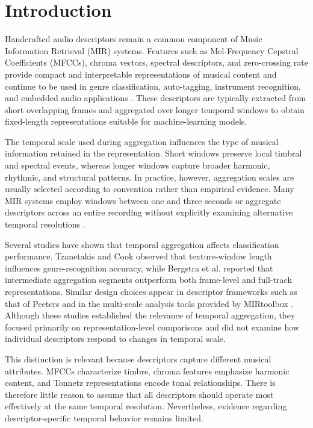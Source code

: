 \documentclass[runningheads]{llncs}
\begin{document}
\section{Introduction}

Handcrafted audio descriptors remain a common component of Music Information Retrieval (MIR) systems. Features such as Mel-Frequency Cepstral Coefficients (MFCCs), chroma vectors, spectral descriptors, and zero-crossing rate provide compact and interpretable representations of musical content and continue to be used in genre classification, auto-tagging, instrument recognition, and embedded audio applications \cite{ding2023audio,tamm2024comparative}. These descriptors are typically extracted from short overlapping frames and aggregated over longer temporal windows to obtain fixed-length representations suitable for machine-learning models.

The temporal scale used during aggregation influences the type of musical information retained in the representation. Short windows preserve local timbral and spectral events, whereas longer windows capture broader harmonic, rhythmic, and structural patterns. In practice, however, aggregation scales are usually selected according to convention rather than empirical evidence. Many MIR systems employ windows between one and three seconds or aggregate descriptors across an entire recording without explicitly examining alternative temporal resolutions \cite{peeters2004large}.

Several studies have shown that temporal aggregation affects classification performance. Tzanetakis and Cook \cite{tzanetakis2002musical} observed that texture-window length influences genre-recognition accuracy, while Bergstra et al. \cite{bergstra2006aggregate} reported that intermediate aggregation segments outperform both frame-level and full-track representations. Similar design choices appear in descriptor frameworks such as that of Peeters \cite{peeters2004large} and in the multi-scale analysis tools provided by MIRtoolbox \cite{lartillot2008multi}. Although these studies established the relevance of temporal aggregation, they focused primarily on representation-level comparisons and did not examine how individual descriptors respond to changes in temporal scale.

This distinction is relevant because descriptors capture different musical attributes. MFCCs characterize timbre, chroma features emphasize harmonic content, and Tonnetz representations encode tonal relationships. There is therefore little reason to assume that all descriptors should operate most effectively at the same temporal resolution. Nevertheless, evidence regarding descriptor-specific temporal behavior remains limited.
\end{document}
